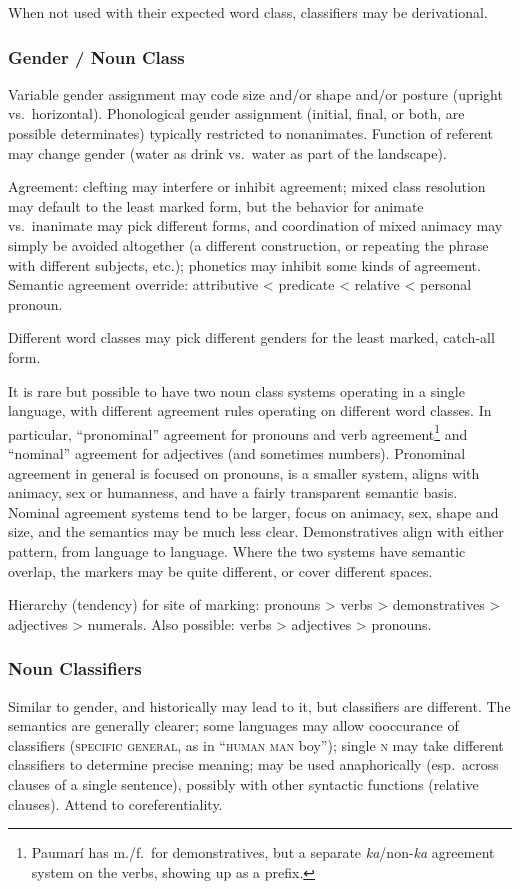 \documentclass[11pt]{article}
\newcommand{\I}[1]{\textsc{#1}}   %
\begin{document}
When not used with their expected word class, classifiers may be
derivational.

\subsubsection{Gender / Noun Class}
Variable gender assignment may code size and/or shape and/or posture
(upright vs.\ horizontal).  Phonological gender assignment (initial,
final, or both, are possible determinates) typically restricted to
nonanimates.  Function of referent may change gender (water as drink
vs.\ water as part of the landscape).

Agreement: clefting may interfere or inhibit agreement; mixed class
resolution may default to the least marked form, but the behavior for
animate vs.\ inanimate may pick different forms, and coordination of
mixed animacy may simply be avoided altogether (a different
construction, or repeating the phrase with different subjects, etc.);
phonetics may inhibit some kinds of agreement.  Semantic agreement
override: attributive < predicate < relative < personal pronoun.

Different word classes may pick different genders for the least
marked, catch-all form.

It is rare but possible to have two noun class systems operating in a
single language, with different agreement rules operating on different
word classes.  In particular, ``pronominal'' agreement for pronouns
and verb agreement\footnote{Paumarí has m./f.\ for demonstratives, but
a separate \textit{ka}/non-\textit{ka} agreement system on the
verbs, showing up as a prefix.} and ``nominal'' agreement for
adjectives (and sometimes numbers).  Pronominal agreement in general
is focused on pronouns, is a smaller system, aligns with animacy, sex
or humanness, and have a fairly transparent semantic basis.  Nominal
agreement systems tend to be larger, focus on animacy, sex, shape and
size, and the semantics may be much less clear.  Demonstratives align
with either pattern, from language to language.  Where the two systems
have semantic overlap, the markers may be quite different, or cover
different spaces.

Hierarchy (tendency) for site of marking: pronouns > verbs >
demonstratives > adjectives > numerals. Also possible: verbs >
adjectives > pronouns.

\subsubsection{Noun Classifiers}
Similar to gender, and historically may lead to it, but classifiers
are different.  The semantics are generally clearer; some languages
may allow cooccurance of classifiers (\I{specific general}, as in
``\I{human man} boy''); single \I{n} may take different classifiers to
determine precise meaning; may be used anaphorically (esp.\ across
clauses of a single sentence), possibly with other syntactic functions
(relative clauses).  Attend to coreferentiality.
\end{document}
